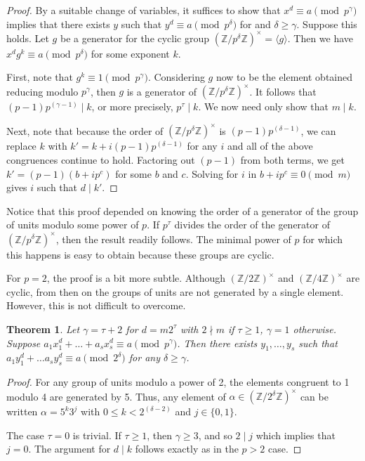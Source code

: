 \documentclass{article}
\newtheorem{theorem}{Theorem}
\begin{document}
\begin{proof}
By a suitable change of variables, it suffices to show that $x^d \equiv a \pmod{p^\gamma}$ implies that there exists $y$ such that $y^d \equiv a \pmod{p^\delta}$ for and $\delta \ge \gamma$.  Suppose this holds.  Let $g$ be a generator for the cyclic group $(\mathbb{Z}/p^\delta\mathbb{Z})^\times = \langle g\rangle$.  Then we have $x^d g^k \equiv a \pmod{p^\delta}$ for some exponent $k$.

First, note that $g^k \equiv 1 \pmod{p^\gamma}$.  Considering $g$ now to be the element obtained reducing modulo $p^\gamma$,  then $g$ is a generator of $(\mathbb{Z}/p^\delta\mathbb{Z})^\times$.  It follows that $(p-1)p^{(\gamma-1)} \mid k$, or more precisely, $p^\tau \mid k$.  We now need only show that $m \mid k$.

Next, note that because the order of $(\mathbb{Z}/p^\delta\mathbb{Z})^\times$ is $(p-1)p^{(\delta-1)}$, we can replace $k$ with $k' = k + i(p-1)p^{(\delta-1)}$ for any $i$ and all of the above congruences continue to hold.  Factoring out $(p-1)$ from both terms, we get $k' = (p-1)(b + ip^c)$ for some $b$ and $c$.  Solving for $i$ in $b + ip^c \equiv 0 \pmod{m}$ gives $i$ such that $d \mid k'$.
\end{proof}

Notice that this proof depended on knowing the order of a generator of the group of units modulo some power of $p$.  If $p^{\tau}$ divides the order of the generator of $(\mathbb{Z}/p^\delta\mathbb{Z})^\times$, then the result readily follows.  The minimal power of $p$ for which this happens is easy to obtain because these groups are cyclic.

For $p=2$, the proof is a bit more subtle.  Although $(\mathbb{Z}/2\mathbb{Z})^\times$ and $(\mathbb{Z}/4\mathbb{Z})^\times$ are cyclic, from then on the groups of units are not generated by a single element.  However, this is not difficult to overcome.

\begin{theorem}
Let $\gamma = \tau + 2$ for $d=m 2^\tau$ with $2 \nmid m$ if $\tau \ge 1$, $\gamma = 1$ otherwise.  Suppose $a_1 x_1^d + \ldots + a_s x_s^d \equiv a \pmod{p^\gamma}$.  Then there exists $y_1, \ldots, y_s$ such that $a_1 y_1^d + \ldots a_s y_s^d \equiv a \pmod{2^\delta}$ for any $\delta \ge \gamma$.
\end{theorem}

\begin{proof}
For any group of units modulo a power of 2, the elements congruent to 1 modulo 4 are generated by 5.  Thus, any element of $\alpha \in (\mathbb{Z}/2^\delta\mathbb{Z})^\times$ can be written $\alpha = 5^k 3^j$ with $0 \le k < 2^{(\delta-2)}$ and $j \in \{0,1\}$.

The case $\tau = 0$ is trivial.  If $\tau \ge 1$, then $\gamma \ge 3$, and so $2 \mid j$ which implies that $j=0$.  The argument for $d \mid k$ follows exactly as in the $p > 2$ case.
\end{proof}
\end{document}

